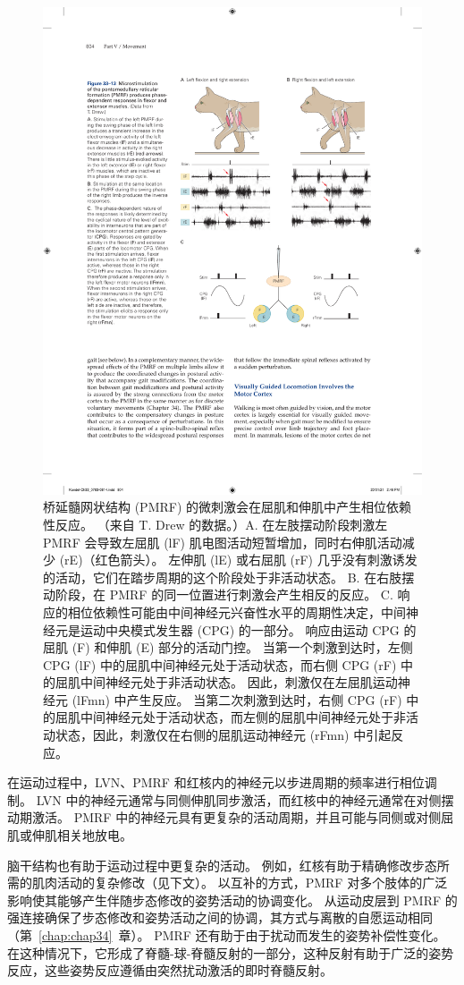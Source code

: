 \begin{figure}[htbp]
	\centering
	\includegraphics[width=0.7\linewidth]{chap33/fig_33_13}
	\caption{桥延髓网状结构 (PMRF) 的微刺激会在屈肌和伸肌中产生相位依赖性反应。 （来自 T. Drew 的数据。）A. 在左肢摆动阶段刺激左 PMRF 会导致左屈肌 (lF) 肌电图活动短暂增加，同时右伸肌活动减少 (rE)（红色箭头）。 左伸肌 (lE) 或右屈肌 (rF) 几乎没有刺激诱发的活动，它们在踏步周期的这个阶段处于非活动状态。 B. 在右肢摆动阶段，在 PMRF 的同一位置进行刺激会产生相反的反应。 C. 响应的相位依赖性可能由中间神经元兴奋性水平的周期性决定，中间神经元是运动中央模式发生器 (CPG) 的一部分。 响应由运动 CPG 的屈肌 (F) 和伸肌 (E) 部分的活动门控。 当第一个刺激到达时，左侧 CPG (lF) 中的屈肌中间神经元处于活动状态，而右侧 CPG (rF) 中的屈肌中间神经元处于非活动状态。 因此，刺激仅在左屈肌运动神经元 (lFmn) 中产生反应。 当第二次刺激到达时，右侧 CPG (rF) 中的屈肌中间神经元处于活动状态，而左侧的屈肌中间神经元处于非活动状态，因此，刺激仅在右侧的屈肌运动神经元 (rFmn) 中引起反应。}
	\label{fig:33_13}
\end{figure}


在运动过程中，LVN、PMRF 和红核内的神经元以步进周期的频率进行相位调制。
LVN 中的神经元通常与同侧伸肌同步激活，而红核中的神经元通常在对侧摆动期激活。
PMRF 中的神经元具有更复杂的活动周期，并且可能与同侧或对侧屈肌或伸肌相关地放电。


脑干结构也有助于运动过程中更复杂的活动。
例如，红核有助于精确修改步态所需的肌肉活动的复杂修改（见下文）。
以互补的方式，PMRF 对多个肢体的广泛影响使其能够产生伴随步态修改的姿势活动的协调变化。
从运动皮层到 PMRF 的强连接确保了步态修改和姿势活动之间的协调，其方式与离散的自愿运动相同（第~\ref{chap:chap34}~章）。
PMRF 还有助于由于扰动而发生的姿势补偿性变化。
在这种情况下，它形成了脊髓-球-脊髓反射的一部分，这种反射有助于广泛的姿势反应，这些姿势反应遵循由突然扰动激活的即时脊髓反射。



